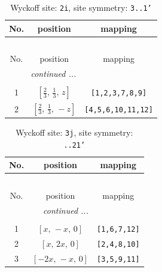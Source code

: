 \documentclass[fleqn,8pt]{jsarticle}
\begin{document}
\renewcommand{\arraystretch}{1.2}
\begin{longtable}{ccc}
\caption{Wyckoff site: {\tt 2i}, site symmetry: {\tt 3..1'}}
 \\
 \hline \hline
No. & position & mapping \\ \hline \endfirsthead

\multicolumn{2}{l}{\tablename\ \thetable{}} \\
 \hline \hline
No. & position & mapping \\ \hline \endhead

 \hline \hline
\multicolumn{2}{r}{\footnotesize\it continued ...} \\ \endfoot

 \hline \hline
\multicolumn{2}{r}{} \\ \endlastfoot

1 & $\left[ \frac{2}{3},\, \frac{1}{3},\, z \right]$ & {\tt [1,2,3,7,8,9]} \\ \hline
2 & $\left[ \frac{2}{3},\, \frac{1}{3},\, - z \right]$ & {\tt [4,5,6,10,11,12]} \\
\end{longtable}
\renewcommand{\arraystretch}{1.2}
\begin{longtable}{ccc}
\caption{Wyckoff site: {\tt 3j}, site symmetry: {\tt ..21'}}
 \\
 \hline \hline
No. & position & mapping \\ \hline \endfirsthead

\multicolumn{2}{l}{\tablename\ \thetable{}} \\
 \hline \hline
No. & position & mapping \\ \hline \endhead

 \hline \hline
\multicolumn{2}{r}{\footnotesize\it continued ...} \\ \endfoot

 \hline \hline
\multicolumn{2}{r}{} \\ \endlastfoot

1 & $\left[ x,\, - x,\, 0 \right]$ & {\tt [1,6,7,12]} \\ \hline
2 & $\left[ x,\, 2 x,\, 0 \right]$ & {\tt [2,4,8,10]} \\ \hline
3 & $\left[ - 2 x,\, - x,\, 0 \right]$ & {\tt [3,5,9,11]} \\
\end{longtable}
\renewcommand{\arraystretch}{1.2}
\end{document}
